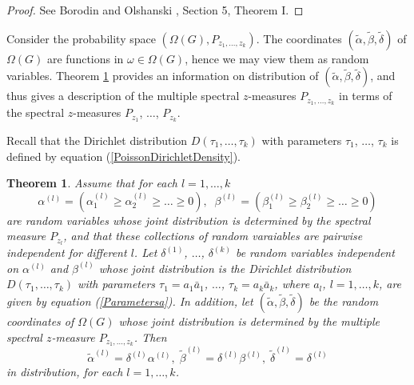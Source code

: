 \documentclass[12pt]{amsart}
\newtheorem{thm}{Theorem}[section]
\theoremstyle{definition}
\numberwithin{equation}{section}
\begin{document}
\begin{proof} See Borodin and Olshanski \cite{BorodinOlshanskiLetters}, Section 5, Theorem I.
\end{proof}
Consider the probability space $\left(\Omega\left(G\right),
P_{z_1,\ldots,z_k}\right)$. The coordinates $\left(\widetilde{\alpha},\widetilde{\beta},\widetilde{\delta}\right)$ of $\Omega\left(G\right)$ are functions in $\omega\in\Omega\left(G\right)$, hence we may view them
as random variables. Theorem \ref{THEOREMDESCRIPTIONOFPz1z2zk}
provides an information on distribution of $\left(\widetilde{\alpha},\widetilde{\beta},\widetilde{\delta}\right)$, and thus gives a description of the multiple spectral $z$-measures $P_{z_1,\ldots,z_k}$ in terms of the spectral $z$-measures
$P_{z_1}$, $\ldots$, $P_{z_k}$.

Recall that the Dirichlet distribution $D\left(\tau_1,\ldots,\tau_k\right)$ with parameters $\tau_1$, $\ldots$, $\tau_k$ is defined by equation (\ref{PoissonDirichletDensity}).
\begin{thm}\label{THEOREMDESCRIPTIONOFPz1z2zk} Assume that for each $l=1,\ldots,k$
$$
\alpha^{(l)}=\left(\alpha_1^{(l)}\geq\alpha_2^{(l)}\geq\ldots\geq 0\right),\;\;
\beta^{(l)}=\left(\beta_1^{(l)}\geq\beta_2^{(l)}\geq\ldots\geq 0\right)
$$
are random variables whose joint distribution is determined by the spectral measure  $P_{z_l}$, and that these collections of random varaiables are pairwise independent for different $l$.
Let
$\delta^{(1)}$, $\ldots$, $\delta^{(k)}$ be random variables independent on $\alpha^{(l)}$ and $\beta^{(l)}$ whose joint distribution is the Dirichlet distribution $D\left(\tau_1,\ldots,\tau_k\right)$ with parameters
$\tau_1=a_1\bar{a}_1$, $\ldots$, $\tau_k=a_k\bar{a}_k$, where $a_l$, $l=1,\ldots, k$, are given by equation (\ref{Parametersa}).
In addition, let $\left(\widetilde{\alpha},\widetilde{\beta},\widetilde{\delta}\right)$
be the random coordinates of $\Omega\left(G\right)$ whose joint distribution is determined by the multiple spectral $z$-measure $P_{z_1,\ldots,z_k}$. Then
\begin{equation}
\widetilde{\alpha}^{(l)}=\delta^{(l)}\alpha^{(l)},\; \widetilde{\beta}^{(l)}=
\delta^{(l)}\beta^{(l)},\;\widetilde{\delta}^{(l)}=\delta^{(l)}
\end{equation}
in distribution, for each $l=1,\ldots,k$.
\end{thm}
\end{document}
